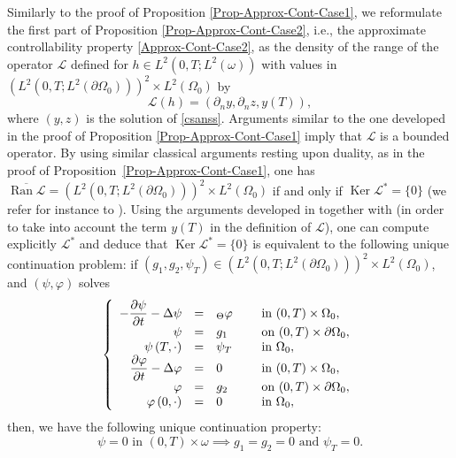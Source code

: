 \documentclass[11pt]{article}
\makeatletter
\newcommand{\ie}{i.e.,\xspace}
\numberwithin{equation}{section}
\DeclareMathOperator{\Ker}{Ker}
\DeclareMathOperator{\Ran}{Ran}
\DeclareRobustCommand{\mathbbm}[1]{\csname jepbb@#1\endcsname}
\theoremstyle{definition}
\makeatother
\begin{document}
Similarly to the proof of Proposition \ref{Prop-Approx-Cont-Case1}, we reformulate the first part of Proposition \ref{Prop-Approx-Cont-Case2}, \ie the approximate controllability property \eqref{Approx-Cont-Case2}, as the density of the range of the operator $\mathcal{L}$ defined for $h \in L^2(0,T; L^2(\omega))$ with values in $(L^2(0,T; L^2(\partial \Omega_0)))^2 \times L^2(\Omega_0)$ by
\[
\mathcal{L} (h) = (\partial_n y, \partial_n z, y(T)),
\]
where $(y,z)$ is the solution of \eqref{csanss}. Arguments similar to the one developed in the proof of Proposition \ref{Prop-Approx-Cont-Case1} imply that $\mathcal L$ is a bounded operator.
By using similar classical arguments resting upon duality, as in the proof of Proposition~\ref{Prop-Approx-Cont-Case1}, one has $\overline{\Ran \mathcal{L}} = (L^2(0,T; L^2(\partial \Omega_0)))^2 \times L^2(\Omega_0)$ if and only if $\Ker \mathcal{L}^* = \{0\}$ (we refer for instance to \cite[Cor.\,2.18]{Brezis}). Using the arguments developed in \cite[Prop.\,2.1]{Lissy-Privat-Simpore} together with \cite[Th.\,2.43, p.\,56]{CNL} (in order to take into account the term $y(T)$ in the definition of $\mathcal L$), one can compute explicitly $\mathcal L^*$ and deduce that $\Ker\mathcal{L}^* = \{0\}$ is equivalent to the following unique continuation problem: if $(g_1, g_2, \psi_T) \in (L^2(0,T; L^2(\partial\Omega_0)))^2\times L^2(\Omega_0)$, and $(\psi, \varphi)$ solves
\begin{equation}
\label{Coupled-Heat-Approx-Adj-Case2}
\left\{
\begin{array}{rcll}
- \dfrac{\partial \psi}{\partial t}-\Delta \psi &=&\mathbbm{1}_{\Theta}\varphi \quad&\text{ in }(0,T) \times \Omega_0,
\\
\psi &=& g_1 &\text{ on }(0,T) \times \partial \Omega_0,
\\
\psi \left(T,\cdot\right) &=& \psi_T &\text{ in }\Omega_0,
\\
\dfrac{\partial \varphi}{\partial t}-\Delta \varphi &=& 0 &\text{ in }(0,T) \times \Omega_0,
\\
\varphi &=& g_2 &\text{ on }(0,T) \times \partial \Omega_0,
\\
\varphi\left(0,\cdot\right) &=&0 &\text{ in }\Omega_0,
\end{array}
\right.
\end{equation}
then, we have the following unique continuation property:
\begin{equation}
\label{UC-Adj-Coupled-Case2}
\psi = 0 \text{ in } (0,T) \times \omega \implies g_1 =g_2 = 0 \text{ and } \psi_T = 0.
\end{equation}
\end{document}
